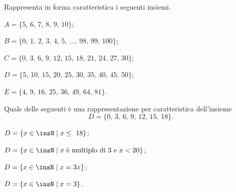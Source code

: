 \begin{esercizio}
\label{ese:5.26}
Rappresenta in forma caratteristica i seguenti insiemi.
\begin{multicols}{2}
\begin{enumeratea}
\item $A=\{\text{5, 6, 7, 8, 9, 10}\}$;
\item $B=\{\text{0, 1, 2, 3, 4, 5, \ldots, 98, 99, 100}\}$;
\item $C=\{\text{0, 3, 6, 9, 12, 15, 18, 21, 24, 27, 30}\}$;
\item $D=\{\text{5, 10, 15, 20, 25, 30, 35, 40, 45, 50}\}$;
\item $E=\{\text{4, 9, 16, 25, 36, 49, 64, 81}\}$.
\end{enumeratea}
\end{multicols}
\end{esercizio}

\begin{esercizio}[\Ast]
\label{ese:5.27}
Quale delle seguenti è una rappresentazione per caratteristica
dell'insieme
\[D = \{\text{0, 3, 6, 9, 12, 15, 18}\}.\]
\begin{enumeratea}
\item $D=\{x\in\insN\mid x\le~18\}$;
\item $D=\{x\in\insN\mid x\text{ è multiplo di~3 e }x<20\}$;%
\item $D=\{x\in\insN\mid x=3x\}$;
\item $D=\{x\in\insN\mid x=3\}$.
\end{enumeratea}
\end{esercizio}

